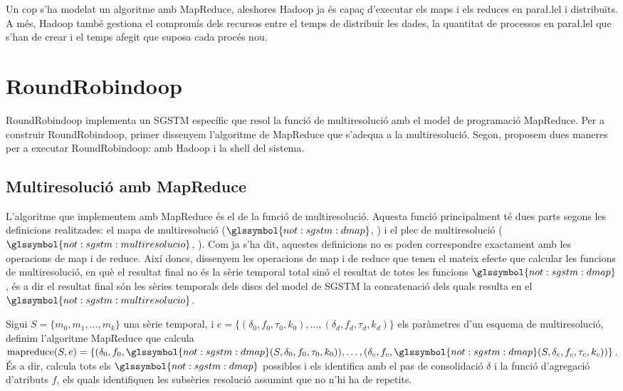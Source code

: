 Un cop s'ha modelat un algoritme amb MapReduce, aleshores Hadoop ja és
capaç d'executar els maps i els reduces en para\l.lel i distribuïts. A
més, Hadoop també gestiona el compromís dels recursos entre el temps
de distribuir les dades, la quantitat de processos en para\l.lel que
s'han de crear i el temps afegit que suposa cada procés nou.








\section{RoundRobindoop}


RoundRobindoop implementa un \gls{SGSTM} específic que resol la funció
de multiresolució amb el model de programació MapReduce.  Per a
construir RoundRobindoop, primer dissenyem l'algoritme de MapReduce
que s'adequa a la multiresolució. Segon, proposem dues maneres per a
executar RoundRobindoop: amb Hadoop i la shell del sistema.



\subsection{Multiresolució amb MapReduce}

L'algoritme que implementem amb MapReduce és el de la funció de
multiresolució. Aquesta funció principalment té dues parts segons les
definicions realitzades: el mapa de multiresolució
($\glssymbol{not:sgstm:dmap}$, ) i el
plec de multiresolució ($\glssymbol{not:sgstm:multiresolucio}$,
). Com ja s'ha dit, aquestes
definicions no es poden correspondre exactament amb les operacions de
map i de reduce.  Així doncs, dissenyem les operacions de map i de
reduce que tenen el mateix efecte que calcular les funcions de
multiresolució, en què el resultat final no és la sèrie temporal total
sinó el resultat de totes les funcions $\glssymbol{not:sgstm:dmap}$,
és a dir el resultat final són les sèries temporals dels discs del
model de \gls{SGSTM} la concatenació dels quals resulta en el
$\glssymbol{not:sgstm:multiresolucio}$.



Sigui $S=\{m_0,m_1,\dotsc,m_k\}$ una sèrie temporal, i $e = \{
(\delta_0,f_0,\tau_0,k_0),\ldots, (\delta_d,f_d,\tau_d,k_d)\}$ els
paràmetres d'un esquema de multiresolució, definim l'algoritme
MapReduce que calcula $\operatorname{mapreduce}(S,e) = \{
(\delta_0,f_0,
\glssymbol{not:sgstm:dmap}(S,\delta_0,f_0,\tau_0,k_0)),\dotsc,
(\delta_c,f_c,\glssymbol{not:sgstm:dmap}(S,\delta_c,f_c,\tau_c,k_c))
\}$. És a dir, calcula tots els $\glssymbol{not:sgstm:dmap}$ possibles
i els identifica amb el pas de consolidació $\delta$ i la funció
d'agregació d'atributs $f$, els quals identifiquen les subsèries
resolució assumint que no n'hi ha de repetits.





